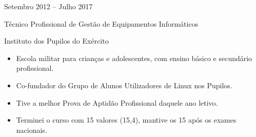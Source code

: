 \documentclass[a4paper,10pt]{article}
\newlength{\cvcolumngapwidth}
\newlength{\cvleftcolumnwidth}
\newlength{\cvrightcolumnwidth}
\newcommand{\cvtitlestyle}[1]{{\large\cvtitlefont\textcolor{cvtitlecolor}{#1}}}
\newcommand{\cvdurationstyle}[1]{{\small\cvdurationfont\textcolor{cvdurationcolor}{#1}}}
\newlength{\cvafteritemskipamount}
\newlength{\cvaftertitleskipamount}
\newlength{\cvparskip}
\newcommand{\cvitem}[2]{

    \begin{minipage}[t]{\cvleftcolumnwidth}
        \raggedleft #1
    \end{minipage}
    \hspace{\cvcolumngapwidth}
    \begin{minipage}[t]{\cvrightcolumnwidth}
        \setlength{\parskip}{\cvparskip} #2
    \end{minipage}

    \vspace{\cvafteritemskipamount}
}
\newcommand{\cvtitle}[1]{

    \cvtitlestyle{#1}

    \vspace{\cvaftertitleskipamount}

    \vspace{-\cvparskip}
}
\begin{document}
\cvitem{
    \cvdurationstyle{Setembro 2012 -- Julho 2017}
}{
    \cvtitle{Técnico Profissional de Gestão de Equipamentos Informáticos}
    Instituto dos Pupilos do Exército
    \begin{itemize}[leftmargin=*]
        \item Escola militar para crianças e adolescentes, com ensino básico e secundário profissional.
        \item Co-fundador do Grupo de Alunos Utilizadores de Linux nos Pupilos.
        \item Tive a melhor Prova de Aptidão Profissional daquele ano letivo.
        \item Terminei o curso com 15 valores (15,4), mantive os 15 após os exames nacionais.
    \end{itemize}
}
\end{document}
